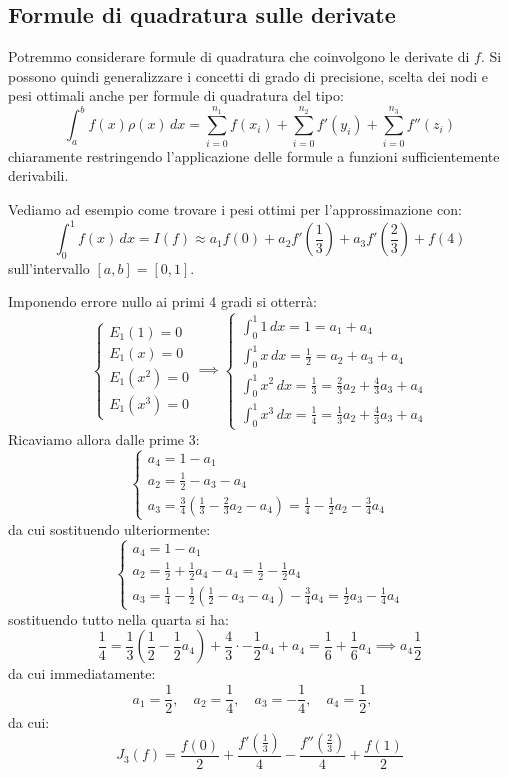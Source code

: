 \documentclass[a4paper,11pt]{article}
\begin{document}
\subsection{Formule di quadratura sulle derivate}
Potremmo considerare formule di quadratura che coinvolgono le derivate di $f$.
Si possono quindi generalizzare i concetti di grado di precisione, scelta dei nodi e pesi ottimali anche per formule di quadratura del tipo:
$$
\int_a^b f(x) \rho(x) \, dx = \sum_{i = 0}^{n_1} f(x_i) + \sum_{i = 0}^{n_2} f'(y_i) + \sum_{i = 0}^{n_3} f''(z_i)
$$
chiaramente restringendo l'applicazione delle formule a funzioni sufficientemente derivabili.

Vediamo ad esempio come trovare i pesi ottimi per l'approssimazione con:
$$
\int_0^1 f(x) \, dx = I(f) \approx a_1 f(0) + a_2 f' \left( \frac{1}{3} \right) + a_3 f' \left( \frac{2}{3} \right) + f(4)
$$
sull'intervallo $[a, b] = [0, 1]$.

Imponendo errore nullo ai primi 4 gradi si otterrà:
\[
	\begin{cases}
		E_1(1)= 0 \\
		E_1(x)= 0 \\
		E_1(x^2)= 0 \\
		E_1(x^3)= 0 
	\end{cases}
	\implies
	\begin{cases}
		\int_0^1 1 \, dx = 1 = a_1 + a_4 \\ 
		\int_0^1 x \, dx = \frac{1}{2} = a_2 + a_3 + a_4 \\
		\int_0^1 x^2 \, dx = \frac{1}{3} = \frac{2}{3} a_2 + \frac{4}{3} a_3 + a_4 \\
		\int_0^1 x^3 \, dx = \frac{1}{4} = \frac{1}{3} a_2 + \frac{4}{3} a_3 + a_4
	\end{cases}
\]
Ricaviamo allora dalle prime 3:
\[
	\begin{cases}
		a_4 = 1 - a_1 \\
		a_2 = \frac{1}{2} - a_3 - a_4 \\ 
		a_3 = \frac{3}{4} \left( \frac{1}{3} - \frac{2}{3} a_2 - a_4 \right) = \frac{1}{4} - \frac{1}{2} a_2 - \frac{3}{4} a_4
\end{cases}
\]
da cui sostituendo ulteriormente:
\[
	\begin{cases}
		a_4 = 1 - a_1 \\ 
		a_2 = \frac{1}{2} + \frac{1}{2} a_4 - a_4 = \frac{1}{2} - \frac{1}{2}a_4 \\ 
		a_3 = \frac{1}{4} - \frac{1}{2} \left( \frac{1}{2} - a_3 - a_4 \right) - \frac{3}{4} a_4 = \frac{1}{2} a_3 - \frac{1}{4}a_4
	\end{cases}
\]
sostituendo tutto nella quarta si ha:
$$
\frac{1}{4} = \frac{1}{3} \left( \frac{1}{2} - \frac{1}{2} a_4 \right) + \frac{4}{3} \cdot - \frac{1}{2} a_4 + a_4 = \frac{1}{6} + \frac{1}{6} a_4 \implies a_4 \frac{1}{2} 
$$
da cui immediatamente:
$$
a_1 = \frac{1}{2}, \quad
a_2 = \frac{1}{4}, \quad
a_3 = -\frac{1}{4}, \quad
a_4 = \frac{1}{2}, \quad
$$
da cui:
$$
J_3(f) = \frac{f(0)}{2} + \frac{f' \left( \frac{1}{3} \right)}{4} - \frac{f'' \left( \frac{2}{3} \right)}{4} + \frac{f(1)}{2}
$$
\end{document}
